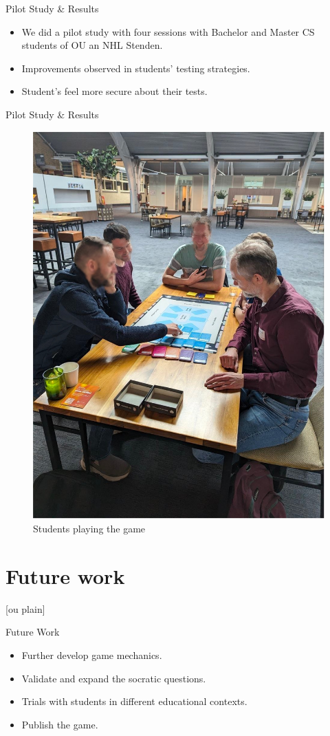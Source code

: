 \documentclass[aspectratio=169]{beamer}
\begin{document}
\begin{frame}{Pilot Study \& Results}
    \begin{itemize}
        \item We did a pilot study with four sessions with Bachelor and Master CS students of OU an NHL Stenden.
        \item Improvements observed in students' testing strategies.
        \item Student's feel more secure about their tests.
    \end{itemize}
\end{frame}

\begin{frame}{Pilot Study \& Results}
    \begin{figure}
        \centering
        \includegraphics[width=0.4\linewidth]{images//Imagen1.jpg}
        \caption{Students playing the game}
    \end{figure}
\end{frame}

\section{Future work}

[ou plain]
\begin{frame}{Future Work}
    \begin{itemize}
        \item Further develop game mechanics.
        \item Validate and expand the socratic questions.
        \item Trials with students in different educational contexts.
        \item Publish the game.
    \end{itemize}
\end{frame}
\end{document}
